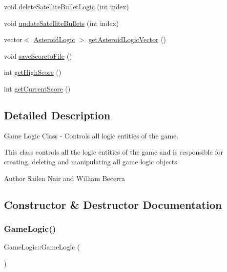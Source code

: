\begin{DoxyCompactItemize}
\item 
void \hyperlink{class_game_logic_a4527756097ff2039fd91daad430e8598}{delete\+Satellite\+Bullet\+Logic} (int index)
\item 
void \hyperlink{class_game_logic_a353d4a44a09214c0ed73aa3a26b2ce0d}{update\+Satellite\+Bullets} (int index)
\item 
vector$<$ \hyperlink{class_asteroid_logic}{Asteroid\+Logic} $>$ \hyperlink{class_game_logic_a084386ea39d66e3963ba248f7affabe0}{get\+Asteroid\+Logic\+Vector} ()
\item 
void \hyperlink{class_game_logic_a594da37684d54d619214e8f96b80279c}{save\+Scoreto\+File} ()
\item 
int \hyperlink{class_game_logic_a05ad3bbd5acd9f0b41d1f1d29cac8017}{get\+High\+Score} ()
\item 
int \hyperlink{class_game_logic_a56e4499d60c8784c3bf34ab91a75e273}{get\+Current\+Score} ()
\end{DoxyCompactItemize}


\subsection{Detailed Description}
Game Logic Class -\/ Controls all logic entities of the game. 

This class controls all the logic entities of the game and is responsible for creating, deleting and manipulating all game logic objects. \begin{DoxyAuthor}{Author}
Sailen Nair and William Becerra 
\end{DoxyAuthor}


\subsection{Constructor \& Destructor Documentation}
\mbox{\label{class_game_logic_a996cd781691c36922e7ce792fcb21640}} 
\subsubsection{\texorpdfstring{Game\+Logic()}{GameLogic()}}
{\footnotesize\ttfamily Game\+Logic\+::\+Game\+Logic (\begin{DoxyParamCaption}{ }\end{DoxyParamCaption})}



